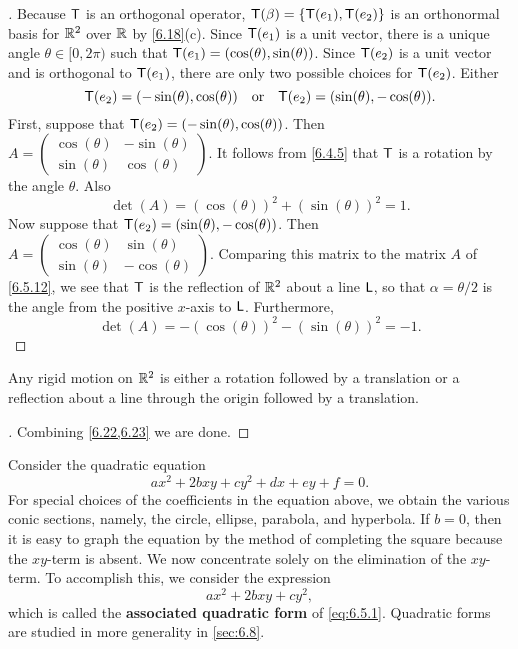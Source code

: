 \begin{proof}[]
  Because \(\mathsf{T}\) is an orthogonal operator, \(\mathsf{T}(\beta) = \left\lbrace\mathsf{T}(e_1), \mathsf{T}(e_2)\right\rbrace\) is an orthonormal basis for \(\mathbb{R}^2\) over \(\mathbb{R}\) by \cref{6.18}(c).
  Since \(\mathsf{T}(e_1)\) is a unit vector, there is a unique angle \(\theta \in [0, 2 \pi)\) such that \(\mathsf{T}(e_1) = (\cos(\theta), \sin(\theta))\).
  Since \(\mathsf{T}(e_2)\) is a unit vector and is orthogonal to \(\mathsf{T}(e_1)\), there are only two possible choices for \(\mathsf{T}(e_2)\).
  Either
  \[
    \mathsf{T}(e_2) = (-\sin(\theta), \cos(\theta)) \quad \text{or} \quad \mathsf{T}(e_2) = (\sin(\theta), -\cos(\theta)).
  \]
  First, suppose that \(\mathsf{T}(e_2) = (-\sin(\theta), \cos(\theta))\).
  Then \(A = \begin{pmatrix}
    \cos(\theta) & -\sin(\theta) \\
    \sin(\theta) & \cos(\theta)
  \end{pmatrix}\).
  It follows from \cref{6.4.5} that \(\mathsf{T}\) is a rotation by the angle \(\theta\).
  Also
  \[
    \det(A) = (\cos(\theta))^2 + (\sin(\theta))^2 = 1.
  \]
  Now suppose that \(\mathsf{T}(e_2) = (\sin(\theta), -\cos(\theta))\).
  Then \(A = \begin{pmatrix}
    \cos(\theta) & \sin(\theta)  \\
    \sin(\theta) & -\cos(\theta)
  \end{pmatrix}\).
  Comparing this matrix to the matrix \(A\) of \cref{6.5.12}, we see that \(\mathsf{T}\) is the reflection of \(\mathbb{R}^2\) about a line \(\mathsf{L}\), so that \(\alpha = \theta / 2\) is the angle from the positive \(x\)-axis to \(\mathsf{L}\).
  Furthermore,
  \[
    \det(A) = - (\cos(\theta))^2 - (\sin(\theta))^2 = -1.
  \]
\end{proof}

\begin{cor}\label{6.5.17}
  Any rigid motion on \(\mathbb{R}^2\) is either a rotation followed by a translation or a reflection about a line through the origin followed by a translation.
\end{cor}

\begin{proof}[]
  Combining \cref{6.22,6.23} we are done.
\end{proof}

\begin{defn}\label{6.5.18}
  Consider the quadratic equation
  \begin{equation}\label{eq:6.5.1}
    ax^2 + 2bxy + cy^2 + dx + ey + f = 0.
  \end{equation}
  For special choices of the coefficients in the equation above, we obtain the various conic sections, namely, the circle, ellipse, parabola, and hyperbola.
  If \(b = 0\), then it is easy to graph the equation by the method of completing the square because the \(xy\)-term is absent.
  We now concentrate solely on the elimination of the \(xy\)-term.
  To accomplish this, we consider the expression
  \begin{equation}\label{eq:6.5.2}
    ax^2 + 2bxy + cy^2,
  \end{equation}
  which is called the \textbf{associated quadratic form} of \cref{eq:6.5.1}.
  Quadratic forms are studied in more generality in \cref{sec:6.8}.
\end{defn}

